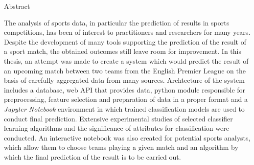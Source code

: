 \documentclass[polish,bachelor,a4paper,oneside]{ppfcmthesis}
\begin{document}
 

\begin{center}
    \huge Abstract
\end{center}
The analysis of sports data, in particular the prediction of results in sports competitions, has been of interest to practitioners and researchers for many years. Despite the development of many tools supporting the prediction of the result of a sport match, the obtained outcomes still leave room for improvement. In this thesis, an attempt was made to create a system which would predict the result of an upcoming match between two teams from the English Premier League on the basis of carefully aggregated data from many sources. Archtecture of the system includes a database, web API that provides data, python module responsible for preprocessing, feature selection and preparation of data in a proper format and a \textit{Jupyter Notebook} environment in which trained classification models are used to conduct final prediction. Extensive experimental studies of selected classifier learning algorithms and the significance of attributes for classification were conducted. An interactive notebook was also created for potential sports analysts, which allow them to choose teams playing a given match and an algorithm by which the final prediction of the result is to be carried out.


\newpage\null\thispagestyle{empty}\newpage
\newpage
{}\pagestyle{ppfcmthesis}%
\tableofcontents* 
\cleardoublepage %

\mainmatter%









{\raggedright\sloppy\small}

\newpage\null\thispagestyle{empty}\newpage
\cleardoublepage\appendix%
\end{document}
